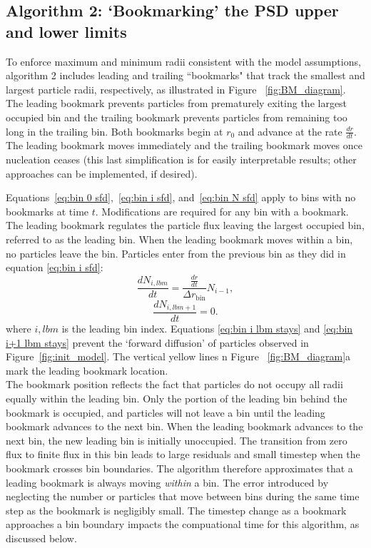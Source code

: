 \documentclass[final,3p,times,twocolumn, 12pt]{elsarticle}
\begin{document}
\subsection{Algorithm 2: `Bookmarking' the PSD upper and lower limits}\label{sec:bookmark}
To enforce maximum and minimum radii consistent with the model assumptions, algorithm 2 includes leading and trailing ``bookmarks" that track the smallest and largest particle radii, respectively, as illustrated in Figure ~\ref{fig:BM_diagram}. The leading bookmark prevents particles from prematurely exiting the largest occupied bin and the trailing bookmark prevents particles from remaining too long in the trailing bin. Both bookmarks begin at $r_0$ and advance at the rate $\frac{dr}{dt}$. The leading bookmark moves immediately and the trailing bookmark moves once nucleation ceases (this last simplification is for easily interpretable results; other approaches can be implemented, if desired). 

Equations~\ref{eq:bin 0 sfd},~\ref{eq:bin i sfd}, and~\ref{eq:bin N sfd} apply to bins with no bookmarks at time $t$. Modifications are required for any bin with a bookmark. The leading bookmark regulates the particle flux leaving the largest occupied bin, referred to as the leading bin. When the leading bookmark moves within a bin, no particles leave the bin. Particles enter from the previous bin as they did in equation \ref{eq:bin i sfd}:
\begin{equation}
    \frac{dN_{i,lbm}}{dt}=\frac{\frac{dr}{dt}}{\Delta r_{\mathrm{bin}}}N_{i-1},
    \label{eq:bin i lbm stays}
\end{equation}
\begin{equation}
    \frac{dN_{i,lbm+1}}{dt}=0.
     \label{eq:bin i+1 lbm stays}
\end{equation}
where $i,lbm$ is the leading bin index. Equations \ref{eq:bin i lbm stays} and \ref{eq:bin i+1 lbm stays} prevent the `forward diffusion' of particles observed in Figure~\ref{fig:init_model}. The vertical yellow lines n Figure ~\ref{fig:BM_diagram}a mark the leading bookmark location.\\

The bookmark position reflects the fact that particles do not occupy all radii equally within the leading bin. Only the portion of the leading bin behind the bookmark is occupied, and particles will not leave a bin until the leading bookmark advances to the next bin. When the leading bookmark advances to the next bin, the new leading bin is initially unoccupied. The transition from zero flux to finite flux in this bin leads to large residuals and small timestep when the bookmark crosses bin boundaries. The algorithm therefore approximates that a leading bookmark is always moving \emph{within} a bin. The error introduced by neglecting the number or particles that move between bins during the same time step as the bookmark is negligibly small. The timestep change as a bookmark approaches a bin boundary impacts the compuational time for this algorithm, as discussed below.\\
\end{document}
